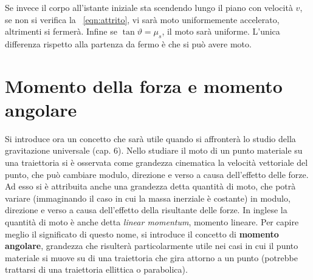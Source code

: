 Se invece il corpo all'istante iniziale sta scendendo lungo il piano con velocità $v$, se non si verifica la ~\eqref{eqn:attrito}, vi sarà moto uniformemente accelerato, altrimenti si fermerà. Infine se $\tan\vartheta=\mu_s$, il moto sarà uniforme. L'unica differenza rispetto alla partenza da fermo è che si può avere moto.

\section{Momento della forza e momento angolare}

Si introduce ora un concetto che sarà utile quando si affronterà lo studio della gravitazione universale (cap. 6). Nello studiare il moto di un punto materiale su una traiettoria si è osservata come grandezza cinematica la velocità vettoriale del punto, che può cambiare modulo, direzione e verso a causa dell'effetto delle forze. Ad esso si è attribuita anche una grandezza detta quantità di moto, che potrà variare (immaginando il caso in cui la massa inerziale è costante) in modulo, direzione e verso a causa dell'effetto della risultante delle forze. In inglese la quantità di moto è anche detta \textit{linear momentum}, momento lineare. Per capire meglio il significato di questo nome, si introduce il concetto di \textbf{momento angolare}, grandezza che risulterà particolarmente utile nei casi in cui il punto materiale si muove su di una traiettoria che gira attorno a un punto (potrebbe trattarsi di una traiettoria ellittica o parabolica).

